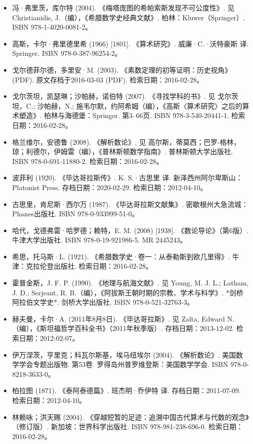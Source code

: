 \begin{itemize}
\item 冯·弗里茨，库尔特 (2004). 《梅塔庞图的希帕索斯发现不可公度性》. 见 Christianidis, J.（编），《希腊数学史经典文献》. 柏林：Kluwer（Springer）. ISBN 978-1-4020-0081-2。
\item 高斯，卡尔·弗里德里希 (1966) [1801]. 《算术研究》. 威廉·C.·沃特豪斯 译. Springer. ISBN 978-0-387-96254-2。
\item 戈尔德菲尔德，多里安·M. (2003). 《素数定理的初等证明：历史视角》 (PDF). 原文存档于2016-03-03 (PDF). 检索日期：2016-02-28。
\item 戈尔茨坦，凯瑟琳；沙帕赫，诺伯特 (2007). 《寻找学科的书》. 见 戈尔茨坦，C.; 沙帕赫，N.; 施韦尔默，约阿希姆（编），《高斯〈算术研究〉之后的算术塑造》. 柏林与海德堡：Springer. 第3–66页. ISBN 978-3-540-20441-1. 检索日期：2016-02-28。
\item 格兰维尔，安德鲁 (2008). 《解析数论》. 见 高尔斯，蒂莫西；巴罗-格林，琼；利德尔，伊姆雷（编），《普林斯顿数学指南》. 普林斯顿大学出版社. ISBN 978-0-691-11880-2. 检索日期：2016-02-28。
\item 波菲利 (1920). 《毕达哥拉斯传》. K. S.·古思里 译. 新泽西州阿尔卑斯山：Platonist Press. 存档日期：2020-02-29. 检索日期：2012-04-10。
\item 古思里，肯尼斯·西尔万 (1987). 《毕达哥拉斯文献集》. 密歇根州大急流城：Phanes出版社. ISBN 978-0-933999-51-0。
\item 哈代，戈德弗雷·哈罗德；赖特，E. M. (2008) [1938]. 《数论导论》（第6版）. 牛津大学出版社. ISBN 978-0-19-921986-5. MR 2445243。
\item 希思，托马斯·L. (1921). 《希腊数学史·卷一：从泰勒斯到欧几里得》. 牛津：克拉伦登出版社. 检索日期：2016-02-28。
\item 霍普金斯，J. F. P. (1990). 《地理与航海文献》. 见 Young, M. J. L.; Latham, J. D.; Serjeant, R. B.（编），《阿拔斯王朝时期的宗教、学术与科学》. *剑桥阿拉伯文学史*. 剑桥大学出版社. ISBN 978-0-521-32763-3。
\item 赫夫曼，卡尔·A. (2011年8月8日). 《毕达哥拉斯》. 见 Zalta, Edward N.（编），《斯坦福哲学百科全书》（2011年秋季版）. 存档日期：2013-12-02. 检索日期：2012-02-07。
\item 伊万涅茨，亨里克；科瓦尔斯基，埃马纽埃尔 (2004). 《解析数论》. 美国数学学会专题出版物. 第53卷. 罗得岛州普罗维登斯：美国数学学会. ISBN 978-0-8218-3633-0。
\item 柏拉图 (1871). 《泰阿泰德篇》. 班杰明·乔伊特 译. 存档日期：2011-07-09. 检索日期：2012-04-10。
\item 林赖咏；洪天赐 (2004). 《穿越短暂的足迹：追溯中国古代算术与代数的观念》（修订版）. 新加坡：世界科学出版社. ISBN 978-981-238-696-0. 检索日期：2016-02-28。

\end{itemize}
